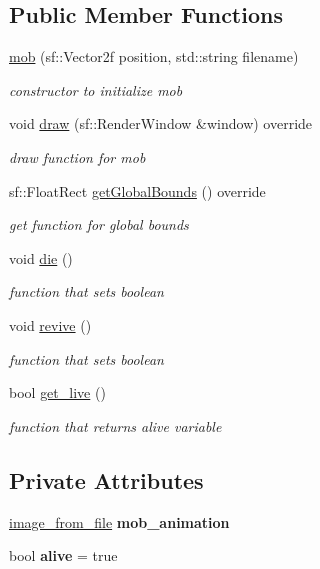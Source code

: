\subsection*{Public Member Functions}
\begin{DoxyCompactItemize}
\item 
\hyperlink{classmob_ac524dd40986df00721239b66c552437e}{mob} (sf\+::\+Vector2f position, std\+::string filename)
\begin{DoxyCompactList}\small\item\em constructor to initialize mob \end{DoxyCompactList}\item 
void \hyperlink{classmob_a52f5e29b2ac2d87c8c1be7e0ff5ec96b}{draw} (sf\+::\+Render\+Window \&window) override
\begin{DoxyCompactList}\small\item\em draw function for mob \end{DoxyCompactList}\item 
sf\+::\+Float\+Rect \hyperlink{classmob_af3859378fad2a5f93a1c4d833ff74d5d}{get\+Global\+Bounds} () override
\begin{DoxyCompactList}\small\item\em get function for global bounds \end{DoxyCompactList}\item 
void \hyperlink{classmob_ae892b3ce84f4aa16411b385abb5410c8}{die} ()
\begin{DoxyCompactList}\small\item\em function that sets boolean \end{DoxyCompactList}\item 
void \hyperlink{classmob_a3bce6c06653881f8be86fbc60a2b67cb}{revive} ()
\begin{DoxyCompactList}\small\item\em function that sets boolean \end{DoxyCompactList}\item 
bool \hyperlink{classmob_ab327a1798c02be3f9db7c1d01b17ba02}{get\+\_\+live} ()
\begin{DoxyCompactList}\small\item\em function that returns alive variable \end{DoxyCompactList}\end{DoxyCompactItemize}
\subsection*{Private Attributes}
\begin{DoxyCompactItemize}
\item 
\mbox{\label{classmob_a28d29e0a52a7094c995df09dcdcf0d3e}} 
\hyperlink{classimage__from__file}{image\+\_\+from\+\_\+file} {\bfseries mob\+\_\+animation}
\item 
\mbox{\label{classmob_aae8e9788785c59d1f4c81c8e0d0e5227}} 
bool {\bfseries alive} = true
\end{DoxyCompactItemize}
